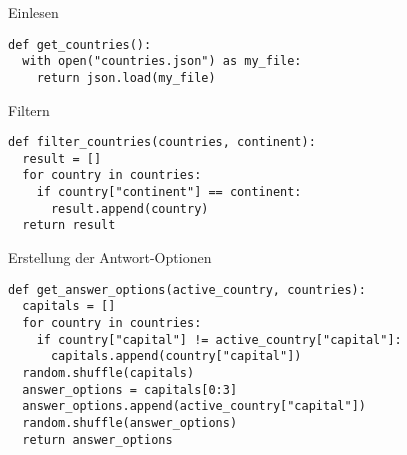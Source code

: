 \begin{fragile}

\begin{block}{Einlesen}
\vspace{2pt}
\begin{verbatim}
def get_countries():
  with open("countries.json") as my_file:
    return json.load(my_file)
\end{verbatim}
\end{block}

\vspace{12pt}
\pause 

\begin{block}{Filtern}
\vspace{2pt}
\begin{verbatim}
def filter_countries(countries, continent):
  result = []
  for country in countries:
    if country["continent"] == continent:
      result.append(country)
  return result
\end{verbatim}
\end{block}

\end{fragile}

\begin{fragile}
	
\begin{block}{Erstellung der Antwort-Optionen}
\vspace{2pt}
\begin{verbatim}
def get_answer_options(active_country, countries):
  capitals = []
  for country in countries:
    if country["capital"] != active_country["capital"]:
      capitals.append(country["capital"])
  random.shuffle(capitals)
  answer_options = capitals[0:3]
  answer_options.append(active_country["capital"])
  random.shuffle(answer_options)
  return answer_options
\end{verbatim}
\end{block}

\end{fragile}

